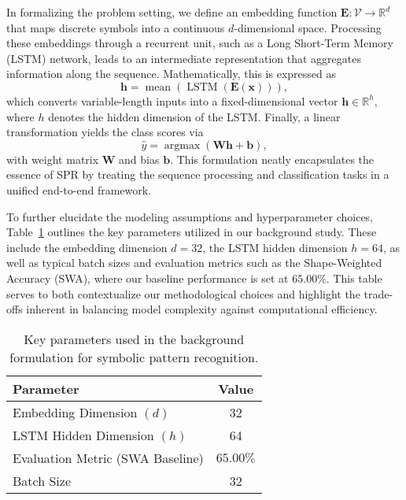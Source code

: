 \documentclass{article}
\begin{document}
In formalizing the problem setting, we define an embedding function \( \mathbf{E}: \mathcal{V} \rightarrow \mathbb{R}^d \) that maps discrete symbols into a continuous \( d \)-dimensional space. Processing these embeddings through a recurrent unit, such as a Long Short-Term Memory (LSTM) network, leads to an intermediate representation that aggregates information along the sequence. Mathematically, this is expressed as
\[
\mathbf{h} = \operatorname{mean}\left(\operatorname{LSTM}\left(\mathbf{E}(\mathbf{x})\right)\right),
\]
which converts variable-length inputs into a fixed-dimensional vector \( \mathbf{h} \in \mathbb{R}^{h} \), where \( h \) denotes the hidden dimension of the LSTM. Finally, a linear transformation yields the class scores via
\[
\hat{y} = \operatorname{argmax}\left(\mathbf{W}\mathbf{h} + \mathbf{b}\right),
\]
with weight matrix \( \mathbf{W} \) and bias \( \mathbf{b} \). This formulation neatly encapsulates the essence of SPR by treating the sequence processing and classification tasks in a unified end-to-end framework.

To further elucidate the modeling assumptions and hyperparameter choices, Table~\ref{tab:background} outlines the key parameters utilized in our background study. These include the embedding dimension \( d=32 \), the LSTM hidden dimension \( h=64 \), as well as typical batch sizes and evaluation metrics such as the Shape-Weighted Accuracy (SWA), where our baseline performance is set at \( 65.00\% \). This table serves to both contextualize our methodological choices and highlight the trade-offs inherent in balancing model complexity against computational efficiency.

\begin{table}[h]
\centering
\begin{tabular}{|l|c|}
\hline
\textbf{Parameter} & \textbf{Value}\\ \hline
Embedding Dimension \( (d) \) & 32\\ \hline
LSTM Hidden Dimension \( (h) \) & 64\\ \hline
Evaluation Metric (SWA Baseline) & \( 65.00\% \)\\ \hline
Batch Size & 32\\ \hline
\end{tabular}
\caption{Key parameters used in the background formulation for symbolic pattern recognition.}
\label{tab:background}
\end{table}
\end{document}
